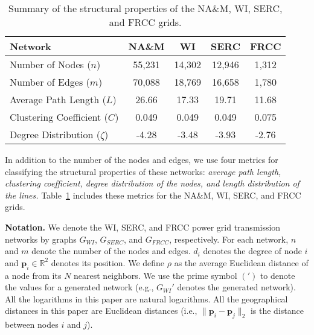 \documentclass[10pt,journal]{IEEEtran}
\begin{document}
\begin{table}[t]
\begin{center}
\caption{Summary of the structural properties of the NA\&M, WI, SERC, and FRCC grids.}
\begin{tabular}{|l|c|c|c|c|}
\hline
Network&NA\&M&WI&SERC&FRCC\\
\hline
Number of Nodes ($n$)&55,231& 14,302 &12,946 &1,312\\
\hline
Number of Edges ($m$)&70,088 &18,769 & 16,658 & 1,780\\
\hline
Average Path Length ($L$)&26.66 &17.33&19.71&11.68\\
\hline
Clustering Coefficient ($C$)&0.049 &0.049&0.049&0.075\\
\hline
Degree Distribution ($\zeta$)&-4.28 &-3.48&-3.93&-2.76\\
\hline
\end{tabular}\label{tb:summary_struct}
\end{center}
\end{table}



In addition to the number of the nodes and edges, we use four metrics for classifying the structural properties of these networks: \emph{average path length, clustering coefficient, degree distribution of the nodes, and length distribution of the lines.} Table~\ref{tb:summary_struct} includes these metrics for the NA\&M, WI, SERC, and FRCC grids.







\noindent\textbf{Notation.} We denote the WI, SERC, and FRCC  power grid transmission networks by graphs $G_{WI}$, $G_{SERC}$, and $G_{FRCC}$, respectively. For each network, $n$ and $m$ denote the number of the nodes and edges. $d_i$ denotes the degree of node $i$ and $\textbf{p}_i\in\mathbb{R}^2$ denotes its position. We define $\rho$ as the average Euclidean distance of a node from its $N$ nearest neighbors.
We use the prime symbol $(')$ to denote the values for a generated network (e.g., $G_{WI}'$ denotes the generated network).  All the logarithms in this paper are natural logarithms. All the geographical distances in this paper are Euclidean distances (i.e., $\|\textbf{p}_i-\textbf{p}_j\|_2$ is the distance between nodes $i$ and $j$).
\end{document}
